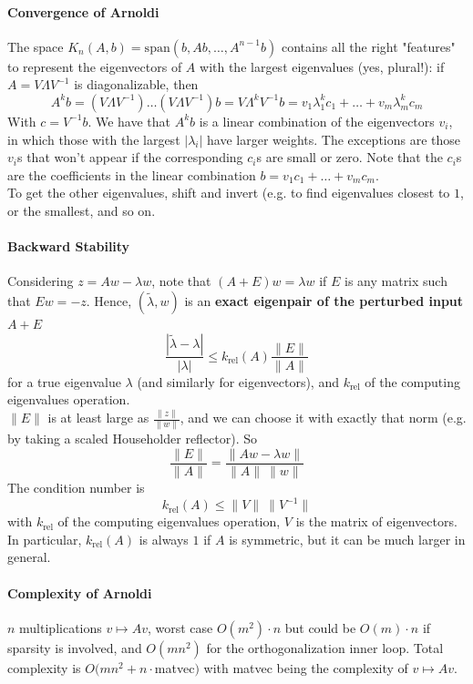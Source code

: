 \documentclass[10pt]{report}
\begin{document}
\paragraph{Convergence of Arnoldi} The space $K_n(A,b)=\text{span}(b, Ab,\ldots, A^{n-1}b)$ contains all the right "features" to represent the eigenvectors of $A$ with the largest eigenvalues (yes, plural!): if $A=V\Lambda V^{-1}$ is diagonalizable, then
$$A^kb = (V\Lambda V^{-1})\ldots(V\Lambda V^{-1})b = V\Lambda^kV^{-1}b = v_1\lambda_1^kc_1+\ldots+v_m\lambda_m^kc_m$$
With $c=V^{-1}b$. We have that $A^kb$ is a linear combination of the eigenvectors $v_i$, in which those with the largest $|\lambda_i|$ have larger weights. The exceptions are those $v_i$s that won't appear if the corresponding $c_i$s are small or zero. Note that the $c_i$s are the coefficients in the linear combination $b = v_1c_1+\ldots+v_mc_m$.\\
To get the other eigenvalues, shift and invert (e.g. to find eigenvalues closest to $1$, or the smallest, and so on.
\paragraph{Backward Stability} Considering $z=Aw-\lambda w$, note that $(A+E)w = \lambda w$ if $E$ is any matrix such that $Ew = -z$. Hence, $(\tilde{\lambda}, w)$ is an \textbf{exact eigenpair of the perturbed input $A+E$}
$$\frac{|\tilde{\lambda} - \lambda|}{|\lambda|} \leq k_{\text{rel}}(A)\frac{\|E\|}{\|A\|}$$
for a true eigenvalue $\lambda$ (and similarly for eigenvectors), and $k_{\text{rel}}$ of the computing eigenvalues operation.\\
$\|E\|$ is at least large as $\frac{\|z\|}{\|w\|}$, and we can choose it with exactly that norm (e.g. by taking a scaled Householder reflector). So
$$\frac{\|E\|}{\|A\|} = \frac{\|Aw-\lambda w\|}{\|A\|\:\|w\|}$$
The condition number is
$$k_{\text{rel}}(A) \leq \|V\|\:\|V^{-1}\|$$
with $k_{\text{rel}}$ of the computing eigenvalues operation, $V$ is the matrix of eigenvectors. In particular, $k_{\text{rel}}(A)$ is always $1$ if $A$ is symmetric, but it can be much larger in general.
\paragraph{Complexity of Arnoldi} $n$ multiplications $v\mapsto Av$, worst case $O(m^2)\cdot n$ but could be $O(m)\cdot n$ if sparsity is involved, and $O(mn^2)$ for the orthogonalization inner loop. Total complexity is $O(mn^2+n\cdot$matvec$)$ with matvec being the complexity of $v\mapsto Av$.
\end{document}
